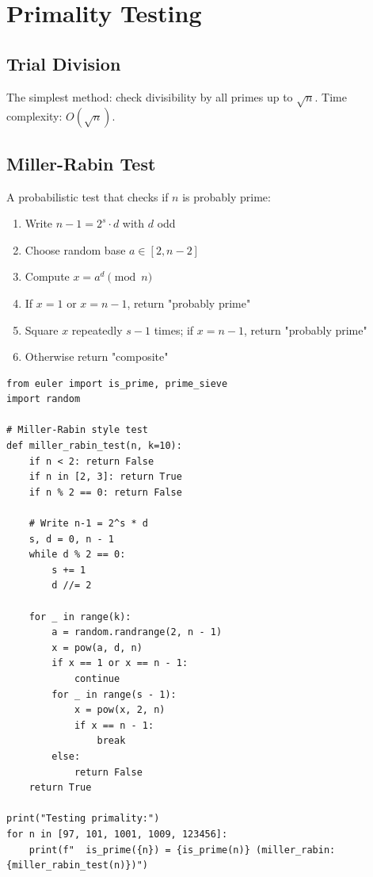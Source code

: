 \section{Primality Testing}

\subsection{Trial Division}
The simplest method: check divisibility by all primes up to $\sqrt{n}$.
Time complexity: $O(\sqrt{n})$.

\subsection{Miller-Rabin Test}
A probabilistic test that checks if $n$ is probably prime:
\begin{enumerate}
\item Write $n-1 = 2^s \cdot d$ with $d$ odd
\item Choose random base $a \in [2, n-2]$
\item Compute $x = a^d \pmod{n}$
\item If $x = 1$ or $x = n-1$, return "probably prime"
\item Square $x$ repeatedly $s-1$ times; if $x = n-1$, return "probably prime"
\item Otherwise return "composite"
\end{enumerate}

\begin{lstlisting}[caption={Primality testing}, label=lst:primality]
from euler import is_prime, prime_sieve
import random

# Miller-Rabin style test
def miller_rabin_test(n, k=10):
    if n < 2: return False
    if n in [2, 3]: return True
    if n % 2 == 0: return False
    
    # Write n-1 = 2^s * d
    s, d = 0, n - 1
    while d % 2 == 0:
        s += 1
        d //= 2
    
    for _ in range(k):
        a = random.randrange(2, n - 1)
        x = pow(a, d, n)
        if x == 1 or x == n - 1:
            continue
        for _ in range(s - 1):
            x = pow(x, 2, n)
            if x == n - 1:
                break
        else:
            return False
    return True

print("Testing primality:")
for n in [97, 101, 1001, 1009, 123456]:
    print(f"  is_prime({n}) = {is_prime(n)} (miller_rabin: {miller_rabin_test(n)})")
\end{lstlisting}

